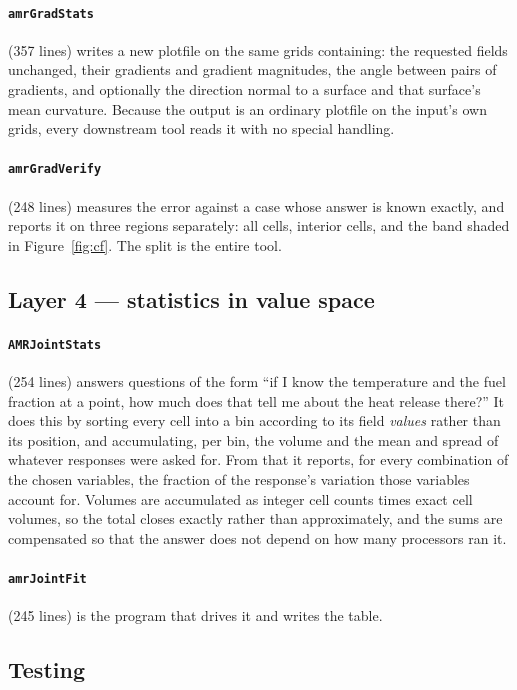 \documentclass[11pt]{article}
\begin{document}
\paragraph{\texttt{amrGradStats}} (357 lines) writes a new plotfile on the same
grids containing: the requested fields unchanged, their gradients and gradient
magnitudes, the angle between pairs of gradients, and optionally the direction
normal to a surface and that surface's mean curvature. Because the output is an
ordinary plotfile on the input's own grids, every downstream tool reads it with
no special handling.

\paragraph{\texttt{amrGradVerify}} (248 lines) measures the error against a case
whose answer is known exactly, and reports it on three regions separately: all
cells, interior cells, and the band shaded in Figure~\ref{fig:cf}. The split is
the entire tool.

\subsection{Layer 4 --- statistics in value space}

\paragraph{\texttt{AMRJointStats}} (254 lines) answers questions of the form
``if I know the temperature and the fuel fraction at a point, how much does
that tell me about the heat release there?'' It does this by sorting every cell
into a bin according to its field \emph{values} rather than its position, and
accumulating, per bin, the volume and the mean and spread of whatever responses
were asked for. From that it reports, for every combination of the chosen
variables, the fraction of the response's variation those variables account
for. Volumes are accumulated as integer cell counts times exact cell volumes,
so the total closes exactly rather than approximately, and the sums are
compensated so that the answer does not depend on how many processors ran it.

\paragraph{\texttt{amrJointFit}} (245 lines) is the program that drives it and
writes the table.

\subsection{Testing}
\end{document}
